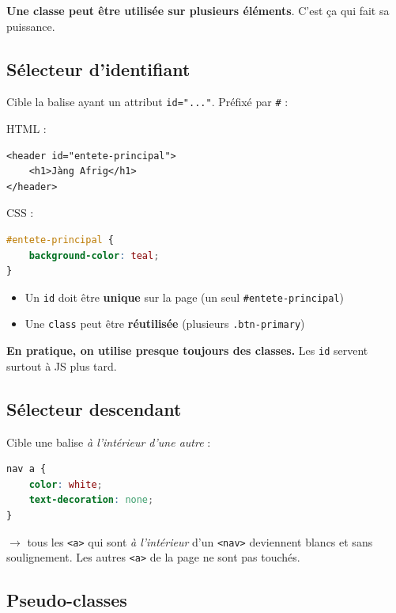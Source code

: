 \documentclass[11pt,a4paper]{article}
\begin{document}
\textbf{Une classe peut être utilisée sur plusieurs éléments}. C'est ça
qui fait sa puissance.

\subsection{Sélecteur d'identifiant}

Cible la balise ayant un attribut \texttt{id="..."}. Préfixé par
\texttt{\#} :

HTML :
\begin{lstlisting}[language=HTML5]
<header id="entete-principal">
    <h1>Jàng Afrig</h1>
</header>
\end{lstlisting}

CSS :
\begin{lstlisting}[language=CSS]
#entete-principal {
    background-color: teal;
}
\end{lstlisting}

\begin{attentionbox}
\begin{itemize}[nosep]
    \item Un \texttt{id} doit être \textbf{unique} sur la page (un seul \texttt{\#entete-principal})
    \item Une \texttt{class} peut être \textbf{réutilisée} (plusieurs \texttt{.btn-primary})
\end{itemize}
\textbf{En pratique, on utilise presque toujours des classes.} Les \texttt{id}
servent surtout à JS plus tard.
\end{attentionbox}

\subsection{Sélecteur descendant}

Cible une balise \emph{à l'intérieur d'une autre} :

\begin{lstlisting}[language=CSS]
nav a {
    color: white;
    text-decoration: none;
}
\end{lstlisting}

$\to$ tous les \texttt{<a>} qui sont \emph{à l'intérieur} d'un \texttt{<nav>}
deviennent blancs et sans soulignement. Les autres \texttt{<a>} de la
page ne sont pas touchés.

\subsection{Pseudo-classes}
\end{document}
